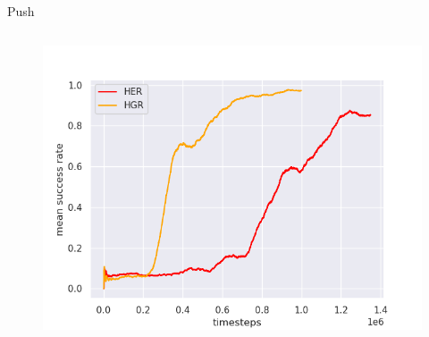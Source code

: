 \documentclass{beamer}
\begin{document}
      \begin{frame}{Push}
            \begin{columns}
                        \centering
                  \begin{figure}
                        \centering
                        \includegraphics[width=\columnwidth]{figures/push.png}
                  \end{figure}
            \end{columns}
      \end{frame}
\end{document}
